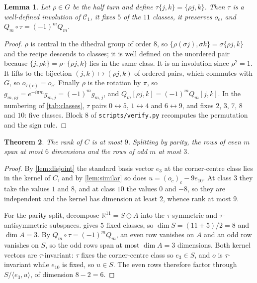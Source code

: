 \documentclass[11pt]{amsart}
\newtheorem{theorem}{Theorem}[section]
\newtheorem{lemma}[theorem]{Lemma}
\theoremstyle{definition}
\theoremstyle{remark}
\begin{document}
\begin{lemma}
\label{lem:tau}
Let $\rho \in G$ be the half turn and define $\tau\{j,k\} = \{\rho j, k\}$. Then $\tau$ is a well-defined involution of $\mathcal C_1$, it fixes $5$ of the $11$ classes, it preserves $o_c$, and $Q_m \circ \tau = (-1)^m Q_m$.
\end{lemma}

\begin{proof}
$\rho$ is central in the dihedral group of order $8$, so $\{\rho(\sigma j), \sigma k\} = \sigma\{\rho j, k\}$ and the recipe descends to classes; it is well defined on the unordered pair because $\{j, \rho k\} = \rho \cdot \{\rho j, k\}$ lies in the same class. It is an involution since $\rho^2 = 1$. It lifts to the bijection $(j,k) \mapsto (\rho j, k)$ of ordered pairs, which commutes with $G$, so $o_{\tau(c)} = o_c$. Finally $\rho$ is the rotation by $\pi$, so $g_{m,\rho j} = e^{-i\pi m} g_{m,j} = (-1)^m g_{m,j}$, and $Q_m[\rho j, k] = (-1)^m Q_m[j,k]$. In the numbering of \cref{tab:classes}, $\tau$ pairs $0 \leftrightarrow 5$, $1 \leftrightarrow 4$ and $6 \leftrightarrow 9$, and fixes $2$, $3$, $7$, $8$ and $10$: five classes. Block 8 of \texttt{scripts/verify.py} recomputes the permutation and the sign rule.
\end{proof}

\begin{theorem}
\label{thm:rank}
The rank of $C$ is at most $9$. Splitting by parity, the rows of even $m$ span at most $6$ dimensions and the rows of odd $m$ at most $3$.
\end{theorem}

\begin{proof}
By \cref{lem:disjoint} the standard basis vector $e_3$ at the corner-centre class lies in the kernel of $C$, and by \cref{lem:similar} so does $u = (o_c)_c - 9 e_{10}$. At class $3$ they take the values $1$ and $8$, and at class $10$ the values $0$ and $-8$, so they are independent and the kernel has dimension at least $2$, whence rank at most $9$.

For the parity split, decompose $\mathbb R^{11} = S \oplus A$ into the $\tau$-symmetric and $\tau$-antisymmetric subspaces.  gives $5$ fixed classes, so $\dim S = (11+5)/2 = 8$ and $\dim A = 3$. By $Q_m \circ \tau = (-1)^m Q_m$, an even row vanishes on $A$ and an odd row vanishes on $S$, so the odd rows span at most $\dim A = 3$ dimensions. Both kernel vectors are $\tau$-invariant: $\tau$ fixes the corner-centre class so $e_3 \in S$, and $o$ is $\tau$-invariant while $e_{10}$ is fixed, so $u \in S$. The even rows therefore factor through $S / \langle e_3, u\rangle$, of dimension $8 - 2 = 6$.
\end{proof}
\end{document}
